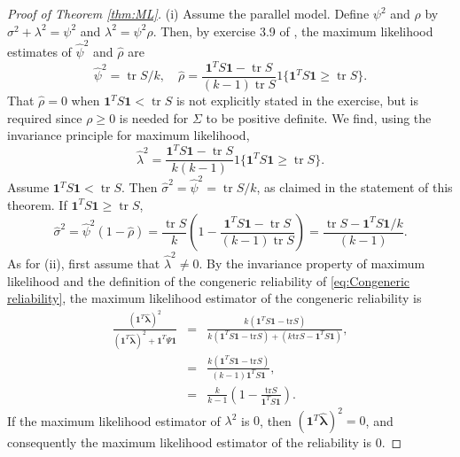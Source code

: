 \documentclass[twoside]{article}
\DeclareMathOperator{\tr}{tr}
\begin{document}
\begin{proof}[Proof of Theorem \ref{thm:ML}]\label{proof:ML}
(i) Assume the parallel model. Define $\psi^{2}$ and $\rho$ by
$\sigma^{2}+\lambda^{2}=\psi^{2}$ and $\lambda^{2}=\psi^{2}\rho$.
Then, by exercise 3.9 of \citet[][p. 114]{Muirhead2009-kq}, the maximum likelihood estimates of $\hat{\psi}^{2}$
and $\hat{\rho}$ are
\[
\hat{\psi}^{2}=\tr S/k,\quad\hat{\rho}=\frac{\boldsymbol{1}^{T}S\boldsymbol{1}-\tr S}{(k-1)\tr S}1\{\boldsymbol{1}^{T}S\boldsymbol{1}\geq\tr S\}.
\]
That $\hat{\rho}=0$ when $\boldsymbol{1}^{T}S\boldsymbol{1}<\tr S$
is not explicitly stated in the exercise, but is required since $\rho\geq0$
is needed for $\Sigma$ to be positive definite. We find, using the invariance
principle for maximum likelihood,
\[
\hat{\lambda}^{2} = \frac{\boldsymbol{1}^{T}S\boldsymbol{1}-\tr S}{k(k-1)}1\{\boldsymbol{1}^{T}S\boldsymbol{1}\geq\tr S\}.
\]
Assume $\boldsymbol{1}^{T}S\boldsymbol{1}<\tr S$. Then $\hat{\sigma}^{2}=\hat{\psi}^{2}=\tr S/k$,
as claimed in the statement of this theorem. If $\boldsymbol{1}^{T}S\boldsymbol{1}\geq\tr S$,
\begin{equation*}
\hat{\sigma}^{2} = \hat{\psi}^{2}(1-\hat{\rho})
 = \frac{\tr S}{k}\left(1-\frac{\boldsymbol{1}^{T}S\boldsymbol{1}-\tr S}{(k-1)\tr S}\right)
 = \frac{\tr S-\boldsymbol{1}^{T}S\boldsymbol{1}/k}{(k-1)}.
\end{equation*}
As for (ii), first assume that $\hat{\lambda}^2\neq 0$. By the invariance property of maximum likelihood and the definition of the congeneric reliability of \cref{eq:Congeneric reliability}, the maximum likelihood estimator of the congeneric reliability is
\begin{eqnarray*}
\frac{(\boldsymbol{1}^{T}\mathbf{\hat{\lambda}})^{2}}{(\boldsymbol{1}^{T}\mathbf{\hat{\lambda}})^{2}+\boldsymbol{1}^{T}\Psi\boldsymbol{1}} & = & \frac{k(\boldsymbol{1}^{T}S\boldsymbol{1}-\textrm{tr}S)}{k(\boldsymbol{1}^{T}S\boldsymbol{1}-\textrm{tr}S)+(k\textrm{tr}S-\boldsymbol{1}^{T}S\boldsymbol{1})},\\
 & = & \frac{k(\boldsymbol{1}^{T}S\boldsymbol{1}-\textrm{tr}S)}{(k-1)\boldsymbol{1}^{T}S\boldsymbol{1}},\\
 & = & \frac{k}{k-1}\left(1-\frac{\textrm{tr}S}{\boldsymbol{1}^{T}S\boldsymbol{1}}\right).
\end{eqnarray*}
If the maximum likelihood estimator of $\lambda^{2}$ is $0$, then $(\boldsymbol{1}^{T}\mathbf{\hat{\lambda}})^{2}=0$,
and consequently the maximum likelihood estimator of the reliability is $0.$
\end{proof}
\end{document}
